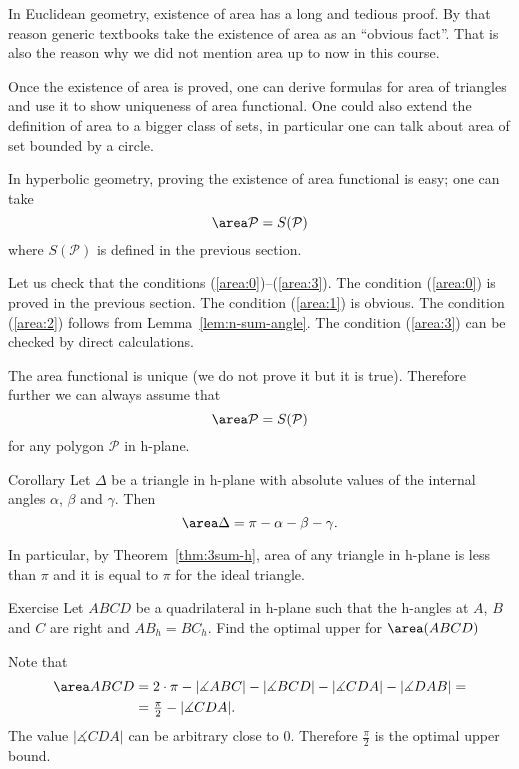 {In Euclidean geometry, existence of area has a  long and tedious proof.
By that reason generic textbooks 
take the existence of area as an ``obvious fact''.
That is also the reason why we did not mention area up to now in this course.

Once the existence of area is proved, 
one can derive formulas for area of triangles and use it to show uniqueness of area functional.
One could also extend the definition of area to a bigger class of sets,
in particular one can talk about area of set bounded by a circle.

In hyperbolic geometry,
proving the existence of area functional is easy;
one can take 
$$\area\mathcal{P}= S(\mathcal{P})$$
where $S(\mathcal{P})$ is defined in the previous section.

Let us check that the conditions (\ref{area:0})--(\ref{area:3}).
The condition (\ref{area:0}) is proved in the previous section.
The condition (\ref{area:1}) is obvious.
The condition (\ref{area:2}) follows from Lemma~\ref{lem:n-sum-angle}.
The condition (\ref{area:3}) can be checked by direct calculations.
\qeds


The area functional is unique (we do not prove it but it is true).
Therefore further we can always assume that
$$\area\mathcal{P}= S(\mathcal{P})$$
for any polygon $\mathcal{P}$ in h-plane.


\begin{thm}{Corollary}\label{cor:area-h-trig}
Let $\Delta$ be a triangle in h-plane with absolute values of the internal angles $\alpha$, $\beta$ and $\gamma$.
Then 
$$\area\Delta=\pi-\alpha-\beta-\gamma.$$

In particular, by Theorem~\ref{thm:3sum-h},
area of any triangle in h-plane is less than $\pi$ and it is equal to $\pi$ for the ideal triangle.
\end{thm}

\begin{thm}{Exercise}\label{ex:area-sup}
Let $ABCD$ be a quadrilateral in h-plane such that the h-angles at $A$, $B$ and $C$ are right and $AB_h=BC_h$.
 Find the optimal upper for $\area(ABCD)$
\end{thm}

















Note that 
\begin{align*}
\area ABCD
&=
2\cdot\pi-|\measuredangle ABC|-|\measuredangle BCD|-|\measuredangle CDA|-|\measuredangle DAB|=
\\
&=\tfrac{\pi}2-|\measuredangle CDA|.
\end{align*}
The value $|\measuredangle CDA|$ can be arbitrary close to $0$.
Therefore $\tfrac{\pi}2$ is the optimal upper bound.









}
